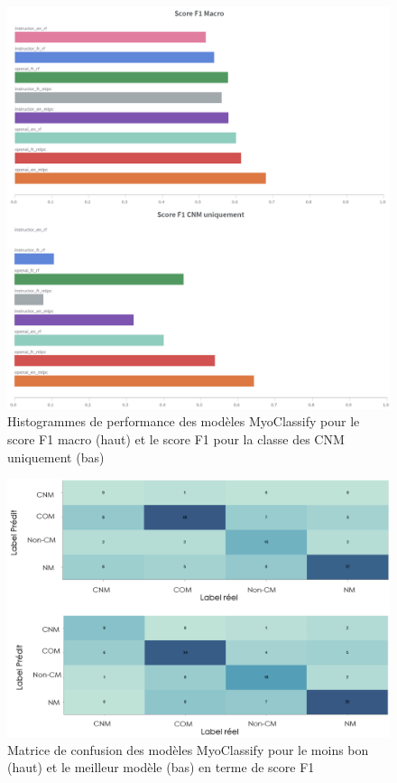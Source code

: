 \begin{figure}[htbp]
  \centering
  \includegraphics[width=1\textwidth]{figures/histo_myoclassify.png}
  \caption[Histogrammes de performance des modèles MyoClassify]{Histogrammes de performance des modèles MyoClassify pour le score F1 macro (haut) et le score F1 pour la classe des CNM uniquement (bas)}
  \label{fig:myoclassify_histo}
\end{figure}
\begin{figure}[htbp]
  \centering
  \includegraphics[width=1\textwidth]{figures/matrix_conf_myoclassify.png}
  \caption[Matrice de confusion MyoClassify]{Matrice de confusion des modèles MyoClassify pour le moins bon (haut) et le meilleur modèle (bas) en terme de score F1}
  \label{fig:myoclassify_conf}
\end{figure}

